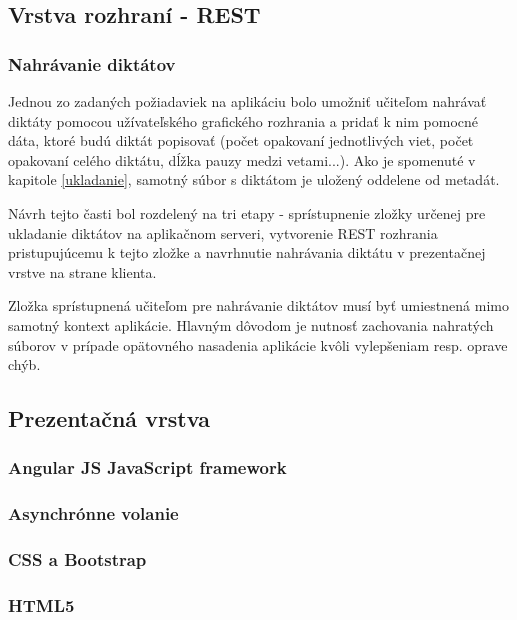 \documentclass[12pt,oneside]{fithesis2}
\begin{document}
      \subsection{Vrstva rozhraní - REST}
         \subsubsection{Nahrávanie diktátov}
   \par Jednou zo zadaných požiadaviek na aplikáciu bolo umožniť učiteľom nahrávať diktáty pomocou užívateľského grafického rozhrania a pridať k nim pomocné dáta, ktoré budú diktát popisovať (počet opakovaní jednotlivých viet, počet opakovaní celého diktátu, dĺžka pauzy medzi vetami...). Ako je spomenuté v kapitole \ref{ukladanie}, samotný súbor s diktátom je uložený oddelene od metadát.
   \par Návrh tejto časti bol rozdelený na tri etapy - sprístupnenie zložky určenej pre ukladanie diktátov na aplikačnom serveri, vytvorenie REST rozhrania pristupujúcemu k tejto zložke a navrhnutie nahrávania diktátu v prezentačnej vrstve na strane klienta.
   \par Zložka sprístupnená učiteľom pre nahrávanie diktátov musí byť umiestnená mimo samotný kontext aplikácie. Hlavným dôvodom je nutnosť zachovania nahratých súborov v prípade opätovného nasadenia aplikácie kvôli vylepšeniam resp. oprave chýb.

      \subsection{Prezentačná vrstva}
      		\subsubsection{Angular JS JavaScript framework}
			\subsubsection{Asynchrónne volanie}
      		\subsubsection{CSS a Bootstrap}
      		\subsubsection{HTML5}
      		\pagebreak
\end{document}
